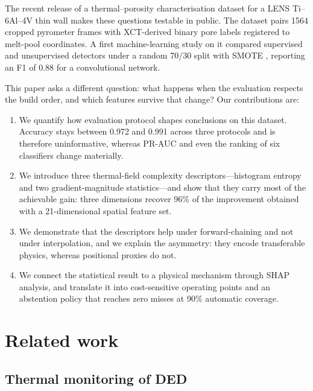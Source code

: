 \documentclass[preprint,12pt]{elsarticle}
\begin{document}
The recent release of a thermal--porosity characterisation dataset for a LENS Ti--6Al--4V thin wall \cite{zamiela2023} makes these questions testable in public. The dataset pairs 1564 cropped pyrometer frames with XCT-derived binary pore labels registered to melt-pool coordinates. A first machine-learning study on it compared supervised and unsupervised detectors under a random 70/30 split with SMOTE \cite{ayyildizli2025}, reporting an F1 of 0.88 for a convolutional network.

This paper asks a different question: what happens when the evaluation respects the build order, and which features survive that change? Our contributions are:

\begin{enumerate}
\item We quantify how evaluation protocol shapes conclusions on this dataset. Accuracy stays between 0.972 and 0.991 across three protocols and is therefore uninformative, whereas PR-AUC and even the ranking of six classifiers change materially.
\item We introduce three thermal-field complexity descriptors---histogram entropy and two gradient-magnitude statistics---and show that they carry most of the achievable gain: three dimensions recover 96\% of the improvement obtained with a 21-dimensional spatial feature set.
\item We demonstrate that the descriptors help under forward-chaining and not under interpolation, and we explain the asymmetry: they encode transferable physics, whereas positional proxies do not.
\item We connect the statistical result to a physical mechanism through SHAP analysis, and translate it into cost-sensitive operating points and an abstention policy that reaches zero misses at 90\% automatic coverage.
\end{enumerate}

\section{Related work}

\subsection{Thermal monitoring of DED}
\end{document}
